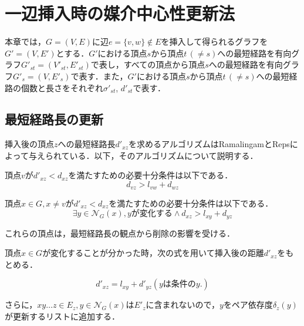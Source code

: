 \chapter{一辺挿入時の媒介中心性更新法}
\label{chap:update-bc-on-insert}
本章では，$G=(V,E)$に辺$e=\{v,w\} \not\in E$を挿入して得られるグラフを
$G'=(V,E')$とする．$G'$における頂点$s$から頂点$t\,(\neq s)$への最短経路を有向グラフ$G'_{st}=(V'_{st},E'_{st})$で表し，すべての頂点から頂点$s$への最短経路を有向グラフ$G'_s=(V,E'_s)$で表す．また，$G'$における頂点$s$から頂点$t\,(\neq s)$への最短経路の個数と長さをそれぞれ$\sigma'_{st}$, $d'_{st}$で表す．

\section{最短経路長の更新}
\label{sect:update-dist-on-insert}

挿入後の頂点$z$への最短経路長$d'_{xz}$を求めるアルゴリズムはRamalingamとRepsによって与えられている．以下，そのアルゴリズムについて説明する．

\begin{lemma-without-proof}
  頂点$v$が$d'_{xz}<d_{xz}$を満たすための必要十分条件は以下である．
  \begin{equation*}
    d_{vz}>l_{vw}+d_{wz}
  \end{equation*}
\end{lemma-without-proof}

\begin{lemma-without-proof}
  頂点$x\in G,x\neq v$が$d'_{xz}<d_{xz}$を満たすための必要十分条件は以下である．
  \begin{equation*}
    \exists y\in\mathcal{N}_G(x),yが変化する\land d_{xz}>l_{xy}+d_{yz}
  \end{equation*}
\end{lemma-without-proof}

これらの頂点は，最短経路長の観点から削除の影響を受ける．

頂点$x\in G$が変化することが分かった時，次の式を用いて挿入後の距離$d'_{xz}$をもとめる．

\begin{corollary-without-proof}
  \begin{equation*}
    d'_{xz}=l_{xy}+d'_{yz} (y\mathrm{は条件の}y.)
  \end{equation*}
\end{corollary-without-proof}

さらに，$xy\ldots z\in E_z,y\in\mathcal{N}_G(x)$は$E'_z$に含まれないので，$y$をペア依存度$\delta_z(y)$が更新するリストに追加する．

